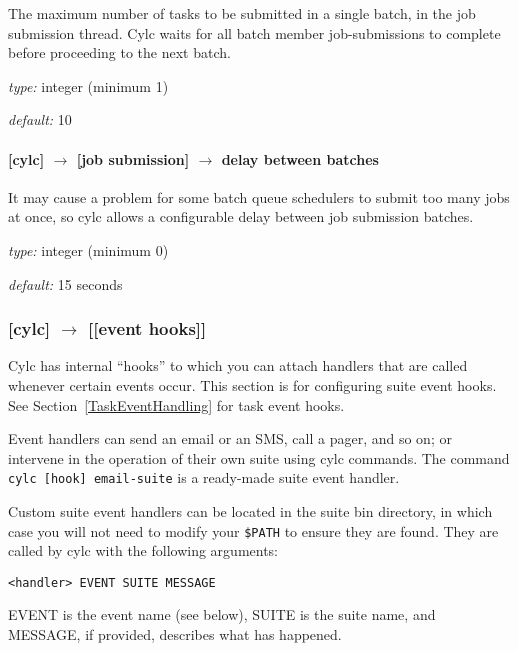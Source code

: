 The maximum number of tasks to be submitted in a single batch, in the
job submission thread. Cylc waits for all batch member job-submissions
to complete before proceeding to the next batch.

\begin{myitemize}
    \item {\em type:} integer (minimum 1)
    \item {\em default:} 10
\end{myitemize}

\paragraph[delay between batches]{[cylc] $\rightarrow$ [job submission] $\rightarrow$ delay between batches}

It may cause a problem for some batch queue schedulers to submit too
many jobs at once, so cylc allows a configurable delay between job 
submission batches.

\begin{myitemize}
    \item {\em type:} integer (minimum 0)
    \item {\em default:} 15 seconds
\end{myitemize}


\subsubsection[{[[}event hooks{]]}]{[cylc] $\rightarrow$ [[event hooks]]}
\label{SuiteEventHandling}

Cylc has internal ``hooks'' to which you can attach handlers that are 
called whenever certain events occur. This section is for configuring suite
event hooks. See Section~\ref{TaskEventHandling} for task event hooks.

Event handlers can send an email or an SMS, call a pager, and so on; or
intervene in the operation of their own suite using cylc commands. 
The command \lstinline=cylc [hook] email-suite= is a ready-made suite
event handler.

Custom suite event handlers can be located in the suite bin directory,  
in which case you will not need to modify your \lstinline=$PATH= to ensure
they are found.  They are called by cylc with the following arguments:
\begin{lstlisting}
<handler> EVENT SUITE MESSAGE
\end{lstlisting}
EVENT is the event name (see below), SUITE is the suite name, and 
MESSAGE, if provided, describes what has happened.


